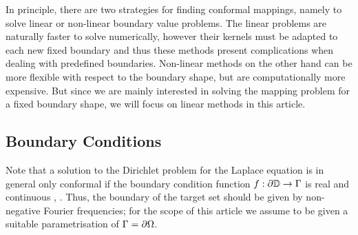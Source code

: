 In principle, there are two strategies for finding conformal mappings, namely to solve linear or non-linear boundary value problems. The linear problems are naturally faster to solve numerically, however their kernels must be adapted to each new fixed boundary and thus these methods present complications when dealing with predefined boundaries. Non-linear methods on the other hand can be more flexible with respect to the boundary shape, but are computationally more expensive. But since we are mainly interested in solving the mapping problem for a fixed boundary shape, we will focus on linear methods in this article.

\subsection{Boundary Conditions}
Note that a solution to the Dirichlet problem for the Laplace equation is in general only conformal if the boundary condition function $f:\partial\mathbb{D}\to\Gamma$ is real and continuous \cite[§13.5]{Henrici1986_vol3}, \cite[Theorem 8]{Wegmann2005_num_methods_confmapping}.
Thus, the boundary of the target set should be given by non-negative Fourier frequencies; for the scope of this article we assume to be given a suitable parametrisation of $\Gamma=\partial\Omega$.




